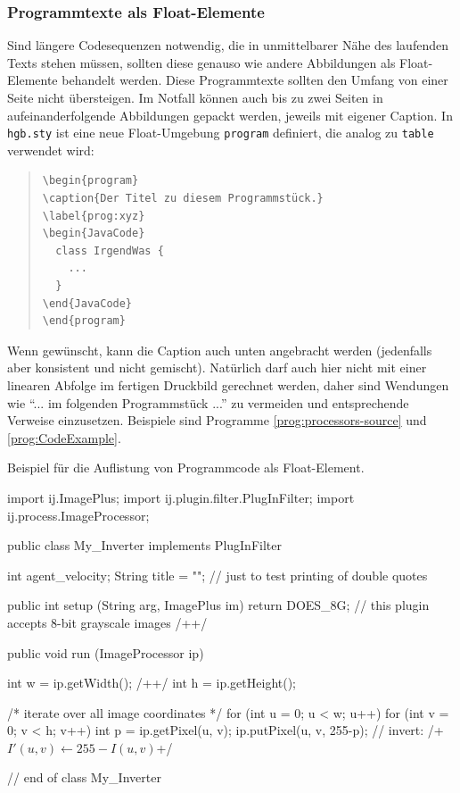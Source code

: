\subsubsection{Programmtexte als Float-Elemente}
Sind längere Codesequenzen notwendig, die in unmittelbarer Nähe des laufenden Texts
stehen müssen, sollten diese genauso wie andere Abbildungen als Float-Elemente
behandelt werden. Diese Programmtexte sollten den Umfang von einer Seite nicht übersteigen.
Im Notfall können auch bis zu zwei Seiten in aufeinanderfolgende Abbildungen gepackt werden,
jeweils mit eigener Caption. In \texttt{hgb.sty} ist eine neue Float-Umgebung \texttt{program} definiert, die analog zu \texttt{table} verwendet wird:
%
\begin{quote}
\begin{verbatim}
\begin{program}
\caption{Der Titel zu diesem Programmstück.}
\label{prog:xyz}
\begin{JavaCode}
  class IrgendWas {
    ...
  }
\end{JavaCode}
\end{program}
\end{verbatim}
\end{quote}
%
Wenn gewünscht, kann die Caption auch unten angebracht werden 
(jedenfalls aber konsistent und nicht gemischt).
Natürlich darf auch hier nicht mit einer linearen Abfolge im fertigen
Druckbild gerechnet werden, daher sind Wendungen wie
"`... im  folgenden Programmstück ..."' zu vermeiden und entsprechende Verweise
einzusetzen. Beispiele sind Programme \ref{prog:processors-source} und \ref{prog:CodeExample}.

\begin{program}
\caption{Beispiel für die Auflistung von Programmcode als Float-Element.}
\label{prog:CodeExample}
\begin{JavaCode}
import ij.ImagePlus;
import ij.plugin.filter.PlugInFilter;
import ij.process.ImageProcessor;

public class My_Inverter implements PlugInFilter {
	int agent_velocity;
  String title = ""; // just to test printing of double quotes

	public int setup (String arg, ImagePlus im) {
		return DOES_8G;	// this plugin accepts 8-bit grayscale images /+\label{pr:IjSamplePlugin10}+/
	}

	public void run (ImageProcessor ip) {
		int w = ip.getWidth();	/+\label{ExampleCodeLabel}+/
		int h = ip.getHeight(); 
		
		/* iterate over all image coordinates */
		for (int u = 0; u < w; u++) { 
			for (int v = 0; v < h; v++) {
				int p = ip.getPixel(u, v); 
				ip.putPixel(u, v, 255-p); // invert: /+$I'(u,v) \leftarrow 255 - I(u,v)$\label{MathInCode}+/
			}
		}
	}		
} // end of class My_Inverter
\end{JavaCode}
%
\end{program}


